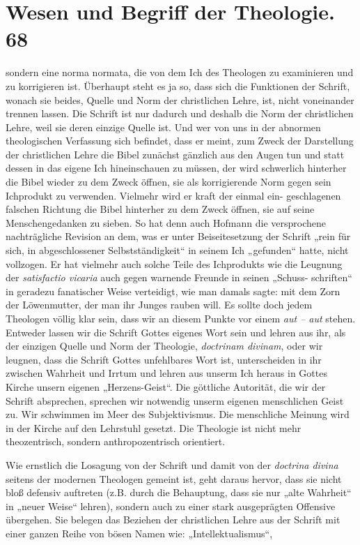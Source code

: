 \section*{Wesen und Begriff der Theologie. \hfill 68}
sondern eine norma normata, die von dem Ich des Theologen zu
examinieren und zu korrigieren ist. Überhaupt steht es ja so, dass
sich die Funktionen der Schrift, wonach sie beides, Quelle und
Norm der christlichen Lehre, ist, nicht voneinander trennen lassen.
Die Schrift ist nur dadurch und deshalb die Norm der christlichen
Lehre, weil sie deren einzige Quelle ist. Und wer von uns in
der abnormen theologischen Verfassung sich befindet, dass er meint,
zum Zweck der Darstellung der christlichen Lehre die Bibel zunächst
gänzlich aus den Augen tun und statt dessen in das eigene Ich
hineinschauen zu müssen, der wird schwerlich hinterher die Bibel
wieder zu dem Zweck öffnen, sie als korrigierende Norm gegen sein
Ichprodukt zu verwenden. Vielmehr wird er kraft der einmal ein-
geschlagenen falschen Richtung die Bibel hinterher zu dem Zweck
öffnen, sie auf seine Menschengedanken zu sieben. So hat denn
auch Hofmann die versprochene nachträgliche Revision an dem, was
er unter Beiseitesetzung der Schrift „rein für sich, in abgeschlossener
Selbstständigkeit“ in seinem Ich „gefunden“ hatte, nicht vollzogen.
Er hat vielmehr auch solche Teile des Ichprodukts wie die Leugnung
der \emph{satisfactio vicaria} auch gegen warnende Freunde in seinen „Schuss-
schriften“ in geradezu fanatischer Weise verteidigt, wie man
damals sagte: mit dem Zorn der Löwenmutter, der man ihr Junges
rauben will. Es sollte doch jedem Theologen völlig klar sein, dass
wir an diesem Punkte vor einem \emph{aut -- aut} stehen. Entweder lassen
wir die Schrift Gottes eigenes Wort sein und lehren aus ihr, als
der einzigen Quelle und Norm der Theologie, \emph{doctrinam divinam},
oder wir leugnen, dass die Schrift Gottes unfehlbares Wort ist,
unterscheiden in ihr zwischen Wahrheit und Irrtum und lehren aus
unserm Ich heraus in Gottes Kirche unsern eigenen „Herzens-Geist“.
Die göttliche Autorität, die wir der Schrift absprechen, sprechen wir
notwendig unserm eigenen menschlichen Geist zu. Wir schwimmen
im Meer des Subjektivismus. Die menschliche Meinung wird in
der Kirche auf den Lehrstuhl gesetzt. Die Theologie ist nicht mehr
theozentrisch, sondern anthropozentrisch orientiert.

Wie ernstlich die Losagung von der Schrift und damit von
der \emph{doctrina divina} seitens der modernen Theologen gemeint ist, geht
daraus hervor, dass sie nicht bloß defensiv auftreten (z.B. durch die
Behauptung, dass sie nur „alte Wahrheit“ in „neuer Weise“ lehren),
sondern auch zu einer stark ausgeprägten Offensive übergehen.
Sie belegen das Beziehen der christlichen Lehre aus der Schrift
mit einer ganzen Reihe von bösen Namen wie: „Intellektualismus“,